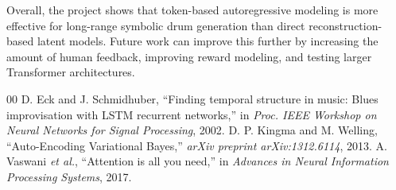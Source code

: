 \documentclass[conference]{IEEEtran}
\begin{document}
Overall, the project shows that token-based autoregressive modeling is more effective for long-range symbolic drum generation than direct reconstruction-based latent models. Future work can improve this further by increasing the amount of human feedback, improving reward modeling, and testing larger Transformer architectures.

\begin{thebibliography}{00}
 D. Eck and J. Schmidhuber, ``Finding temporal structure in music: Blues improvisation with LSTM recurrent networks,'' in \textit{Proc. IEEE Workshop on Neural Networks for Signal Processing}, 2002.
 D. P. Kingma and M. Welling, ``Auto-Encoding Variational Bayes,'' \textit{arXiv preprint arXiv:1312.6114}, 2013.
 A. Vaswani \textit{et al.}, ``Attention is all you need,'' in \textit{Advances in Neural Information Processing Systems}, 2017.
\end{thebibliography}
\end{document}
